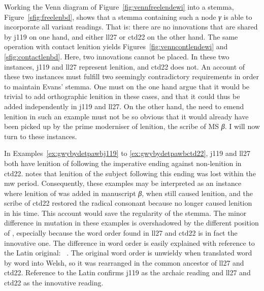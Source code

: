 Working the Venn diagram of Figure~\ref{fig:vennfreelendewi} into a stemma, \ie Figure~\ref{sfig:freelenbd}, shows that a stemma containing such a node \textit{γ} is able to incorporate all variant readings. That is: there are no innovations that are shared by  \gls{j119} on one hand, and either \gls{ll27} or \gls{ctd22} on the other hand. The same operation with contact lenition yields Figures~\ref{fig:venncontlendewi} and \ref{sfig:contactlenbd}. Here, two innovations cannot be placed. In these two instances, \gls{j119} and \gls{ll27} represent lenition, and  \gls{ctd22} does not.
An account of these two instances must fulfill two seemingly contradictory requirements in order to maintain Evans' stemma. One must on the one hand argue that it would be trivial to add orthographic lenition in these cases, and that it could thus be added independently in \gls{j119} and \gls{ll27}. On the other hand, the need to emend lenition in such an example must not be so obvious that it would already have been picked up by the prime moderniser of lenition, the scribe of MS \textit{β}. I will now turn to these instances. 

In Examples~\ref{ex:gwybydetpawbj119} to \ref{ex:gwybydetpawbctd22}, \gls{j119} and \gls{ll27} both have lenition of  following the imperative ending  against non-lenition in \gls{ctd22}. \Textcite[§~79]{morgan_y_1952} notes that lenition of the subject following this ending was lost within the \gls{mw} period. Consequently, these examples may be interpreted as an instance where lenition of  was added in manuscript \textit{β}, when  still caused lenition, and the scribe of \gls{ctd22} restored the radical consonant because  no longer caused lenition in his time. This account would save the regularity of the stemma.
The minor difference in mutation in these examples is overshadowed by the different position of , especially because the word order found in \gls{ll27} and \gls{ctd22} is in fact the innovative one. The difference in word order is easily explained with reference to the Latin original: ~\autocite[157]{Wad_Vitae13}.  The original word order is unwieldy when translated word by word into Welsh, so it was rearranged in the common ancestor of \gls{ll27} and \gls{ctd22}. Reference to the Latin confirms \gls{j119} as the archaic reading and \gls{ll27} and \gls{ctd22} as the innovative reading.

